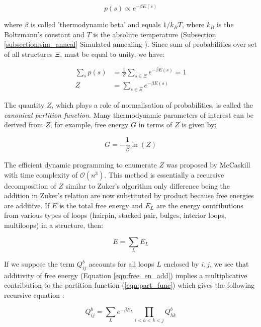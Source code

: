 \begin{equation}
    p(s) \propto e^{-\beta E(s)}
\end{equation}

where $\beta$ is called 'thermodynamic beta' and equals $1/k_B T$, where $k_B$ is the Boltzmann's constant and $T$ is the absolute temperature (Subsection \ref{subsection:sim_anneal} Simulated annealing ). Since sum of probabilities over set of all structures $\Xi$, must be equal to unity, we have:

\begin{equation}
\begin{aligned}
    \sum_s p(s) &= \frac{1}{Z} \sum_{s\in\Xi} e^{-\beta E(s)}  = 1  \\
    Z &= \sum_{s\in\Xi} e^{-\beta E(s)} 
\end{aligned}
\label{eqn:part_func}
\end{equation}

The quantity $Z$, which plays a role of normalisation of probabilities, is called the \textit{canonical partition function}. Many thermodynamic parameters of interest can be derived from $Z$, for example, free energy $G$ in terms of $Z$ is given by:

\begin{equation}
\label{eqn:free_en}
    G = -\frac{1}{\beta} \ln(Z)
\end{equation}

The efficient dynamic programming to enumerate $Z$ was proposed by McCaskill \cite{mccaskill1990equilibrium} with time complexity of $\mathcal{O}(n^{3})$. This method is essentially a recursive decomposition of $Z$ similar to Zuker's algorithm only difference being the addition in Zuker's relation are now substituted by product because free energies are additive. If $E$ is the total free energy and $E_L$ are the energy contributions from various types of loops (hairpin, stacked pair, bulges, interior loops, multiloops) in a structure, then:

\begin{equation}
    E = \sum_L E_L
    \label{eqn:free_en_add}
\end{equation}

If we suppose the term $Q_{ij}^b$ accounts for all loops $L$ enclosed by $i,j$, we see that additivity of free energy (Equation \ref{eqn:free_en_add}) implies a multiplicative contribution to the partition function (\ref{eqn:part_func}) which gives the following recursive equation :

\begin{equation}
    Q_{ij}^b = \sum_L e^{-\beta E_L} \prod_{i<h<k<j} Q_{hk}^b
    \label{eqn:mcc_restr_part}
\end{equation}

